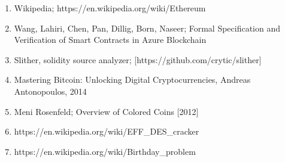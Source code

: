\documentclass{article}
\begin{document}
\begin{enumerate}
  \item Wikipedia; https://en.wikipedia.org/wiki/Ethereum
  \item Wang, Lahiri, Chen, Pan, Dillig, Born, Naseer; Formal Specification and Verification of Smart Contracts in Azure Blockchain
  \item Slither, solidity source analyzer; [https://github.com/crytic/slither]
  \item Mastering Bitcoin: Unlocking Digital Cryptocurrencies, Andreas Antonopoulos, 2014
  \item Meni Rosenfeld; Overview of Colored Coins [2012]
  \item https://en.wikipedia.org/wiki/EFF_DES_cracker
  \item https://en.wikipedia.org/wiki/Birthday_problem
  
  
  



\end{enumerate}
\end{document}
